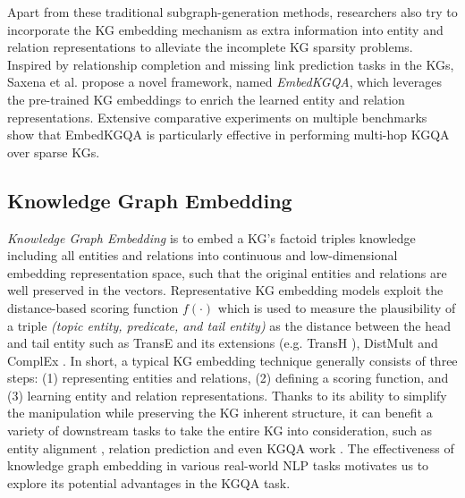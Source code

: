 \documentclass[pdflatex,sn-mathphys]{sn-jnl}%
\theoremstyle{thmstyleone}%
\theoremstyle{thmstyletwo}%
\theoremstyle{thmstylethree}%
\begin{document}

Apart from these traditional subgraph-generation methods, researchers also try to incorporate the KG embedding mechanism as extra information into entity and relation representations to alleviate the incomplete KG sparsity problems. Inspired by relationship completion and missing link prediction tasks in the KGs, Saxena et al. \cite{apoorv2020embedKGQA} propose a novel framework, named \textit{EmbedKGQA}, which leverages the pre-trained KG embeddings to enrich the learned entity and relation representations. Extensive comparative experiments on multiple benchmarks show that EmbedKGQA is particularly effective in performing multi-hop KGQA over sparse KGs.

\subsection{Knowledge Graph Embedding}
\textit{Knowledge Graph Embedding} \cite{huang2019KgeQA} is to embed a KG's factoid triples knowledge including all entities and relations into continuous and low-dimensional embedding representation space, such that the original entities and relations are well preserved in the vectors. Representative KG embedding models exploit the distance-based scoring function $f(\cdot)$ which is used to measure the plausibility of a triple \textit{(topic entity, predicate, and tail entity)} as the distance between the head and tail entity such as TransE \cite{bordes2013transe} and its extensions (e.g. TransH \cite{zwang2014transh}), DistMult \cite{yang2015distmult} and ComplEx \cite{trouillon2016ComplEx}. In short, a typical KG embedding technique generally consists of three steps: (1) representing entities and relations, (2) defining a scoring function, and (3) learning entity and relation representations. Thanks to its ability to simplify the manipulation while preserving the KG inherent structure, it can benefit a variety of downstream tasks to take the entire KG into consideration, such as entity alignment \cite{sunwang2020align}, relation prediction \cite{Nathani2019gat} and even KGQA work \cite{apoorv2020embedKGQA}. The effectiveness of knowledge graph  embedding in various real-world NLP tasks \cite{jiangwanmeies,alies} motivates us to explore its potential advantages in the KGQA task.
\end{document}
